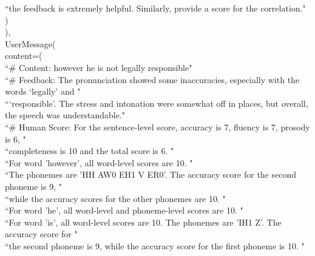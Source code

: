 \documentclass{Interspeech}
\begin{document}
\begin{algorithm}
\begin{algorithmic}[1]
    \STATE \hspace{20mm} ``the feedback is extremely helpful. Similarly, provide a score for the correlation." \\
    \STATE \hspace{15mm} ) \\
    \STATE \hspace{10mm} ), \\
    \STATE \hspace{10mm} UserMessage( \\
    \STATE \hspace{15mm} content=( \\
    \STATE \hspace{20mm} ``\# Content: however he is not legally responsible" \\
    \STATE \hspace{20mm} ``\# Feedback: The pronunciation showed some inaccuracies, especially with the words `legally' and " \\
    \STATE \hspace{20mm} ```responsible'. The stress and intonation were somewhat off in places, but overall, the speech was understandable." \\
    \STATE \hspace{20mm} ``\# Human Score: For the sentence-level score, accuracy is 7, fluency is 7, prosody is 6, " \\
    \STATE \hspace{20mm} ``completeness is 10 and the total score is 6. " \\
    \STATE \hspace{20mm} ``For word 'however', all word-level scores are 10. " \\
    \STATE \hspace{20mm} ``The phonemes are 'HH AW0 EH1 V ER0'. The accuracy score for the second phoneme is 9, " \\
    \STATE \hspace{20mm} ``while the accuracy scores for the other phonemes are 10. " \\
    \STATE \hspace{20mm} ``For word 'he', all word-level and phoneme-level scores are 10. " \\
    \STATE \hspace{20mm} ``For word 'is', all word-level scores are 10. The phonemes are 'IH1 Z'. The accuracy score for " \\
    \STATE \hspace{20mm} ``the second phoneme is 9, while the accuracy score for the first phoneme is 10. " \\

\end{algorithmic}
\end{algorithm}
\end{document}

